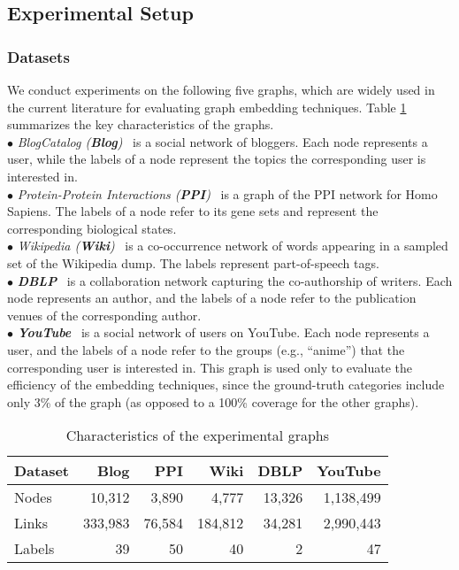 \documentclass[conference]{IEEEtran}
\begin{document}
\subsection{Experimental Setup}

\subsubsection{Datasets}
We conduct experiments on the following five graphs, which are widely used in the current literature for evaluating graph embedding techniques. Table \ref{dataset} summarizes the key characteristics of the graphs.
\\$\bullet$ \emph{BlogCatalog (\textbf{Blog})}~\cite{Tang09} is a social network of bloggers. Each node represents a user, while the labels of a node represent the topics the corresponding user is interested in.
\\$\bullet$ \emph{Protein-Protein Interactions (\textbf{PPI})}~\cite{nd2v16} is a graph of the PPI network for Homo Sapiens. The labels of a node refer to its gene sets and represent the corresponding biological states.
\\$\bullet$ \emph{Wikipedia (\textbf{Wiki})}~\cite{nd2v16} is a co-occurrence network of words appearing in a sampled set of the Wikipedia dump. The labels represent part-of-speech tags.
\\$\bullet$ \emph{\textbf{DBLP}}~\cite{yang2015defining} is a collaboration network capturing the co-authorship of writers. Each node represents an author, and the labels of a node refer to the publication venues of the corresponding author. 
\\$\bullet$ \emph{\textbf{YouTube}}~\cite{tang2009scalable} is a social network of users on YouTube. Each node represents a user, and the labels of a node refer to the groups (e.g., ``anime'') that the corresponding user is interested in. This graph is used only to evaluate the efficiency of the embedding techniques, since the ground-truth categories include only 3\% of the graph (as opposed to a 100\% coverage for the other graphs). \begin{table}[htbp]\small
\vspace{-4pt}
\centering
\caption{Characteristics of the experimental graphs}
\label{dataset}
\vspace{-4pt}
\begin{tabular}{l|rrrrr}\hline
\textbf{Dataset}		&\textbf{Blog}		&\textbf{PPI}	&\textbf{Wiki}	&\textbf{DBLP} 	&\textbf{YouTube}\\ \hline
Nodes			&10,312			&3,890 	&4,777	&13,326 		&1,138,499\\ 
Links			&333,983			&76,584 	&184,812	&34,281		&2,990,443\\ 
Labels			&39 				&50	 	&40		&2			&47\\ \hline
\end{tabular}
\end{table}
\end{document}
